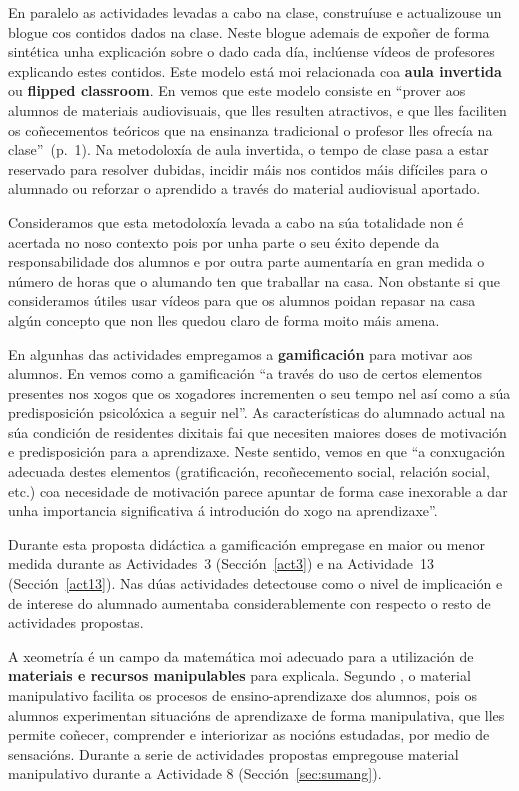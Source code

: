En paralelo as actividades levadas a cabo na clase, construíuse e actualizouse un blogue cos contidos dados na clase. Neste blogue ademais de expoñer de forma sintética unha explicación sobre o dado cada día, inclúense vídeos de profesores explicando estes contidos. Este modelo está moi relacionada coa \textbf{aula invertida} ou \textbf{flipped classroom}. En  vemos que este modelo consiste en ``prover aos alumnos de materiais audiovisuais, que lles resulten atractivos, e que lles faciliten os coñecementos teóricos que na ensinanza tradicional o profesor lles ofrecía na clase''~(p.~1). Na metodoloxía de aula invertida, o tempo de clase pasa a estar reservado para resolver dubidas, incidir máis nos contidos máis difíciles para o alumnado ou reforzar o aprendido a través do material audiovisual aportado.

Consideramos que esta metodoloxía levada a cabo na súa totalidade non é acertada no noso contexto pois por unha parte o seu éxito depende da responsabilidade dos alumnos e por outra parte aumentaría en gran medida o número de horas que o alumando ten que traballar na casa. Non obstante si que consideramos útiles usar vídeos para que os alumnos poidan repasar na casa algún concepto que non lles quedou claro de forma moito máis amena.

En algunhas das actividades empregamos a \textbf{gamificación} para motivar aos alumnos. En  vemos como a gamificación ``a través do uso de certos elementos presentes nos xogos que os xogadores incrementen o seu tempo nel así como a súa predisposición psicolóxica a seguir nel''. As características do alumnado actual na súa condición de residentes dixitais \cite{residentesdigitales} fai que necesiten maiores doses de motivación e predisposición para a aprendizaxe. Neste sentido, vemos en  que ``a conxugación adecuada destes elementos (gratificación, recoñecemento social, relación social, etc.) coa necesidade de motivación parece apuntar de forma case inexorable a dar unha importancia significativa á introdución do xogo na aprendizaxe''.

Durante esta proposta didáctica a gamificación empregase en maior ou menor medida durante as Actividades~3 (Sección~\ref{act3}) e na Actividade~13 (Sección~\ref{act13}). Nas dúas actividades detectouse como o nivel de implicación e de interese do alumnado aumentaba considerablemente con respecto o resto de actividades propostas.

A xeometría é un campo da matemática moi adecuado para a utilización de \textbf{materiais e recursos manipulables} para explicala. Segundo \cite{moreiro2010materiales},  o material manipulativo facilita os procesos de ensino-aprendizaxe dos alumnos, pois os alumnos experimentan situacións de aprendizaxe de forma manipulativa, que lles permite coñecer, comprender e interiorizar as nocións estudadas, por medio de sensacións. Durante a serie de actividades propostas empregouse material manipulativo durante a Actividade 8 (Sección~\ref{sec:sumang}).

